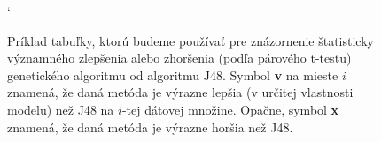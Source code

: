 \begin{figure}[h]
\catcode`
\centering
{}
\caption{Príklad tabuľky, ktorú budeme používať pre znázornenie štatisticky významného zlepšenia alebo zhoršenia (podľa párového t-testu) genetického algoritmu od algoritmu J48. Symbol \textbf{v} na mieste $i$ znamená, že daná metóda je výrazne lepšia (v určitej vlastnosti modelu) než J48 na $i$-tej dátovej množine. Opačne, symbol \textbf{x} znamená, že daná metóda je výrazne horšia než J48.}\label{fig:sign}
\end{figure}